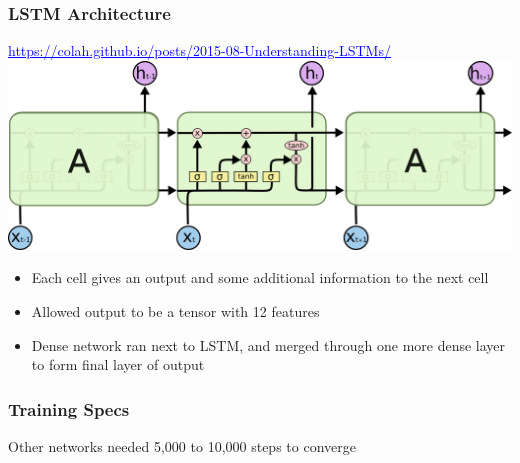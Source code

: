 \documentclass{beamer}
\newcommand{\link}[2]{\href{#2}{\textcolor{blue}{\underline{#1}}}}
\begin{document}
\begin{frame}
  \frametitle{LSTM Architecture}

  \link{https://colah.github.io/posts/2015-08-Understanding-LSTMs/}{https://colah.github.io/posts/2015-08-Understanding-LSTMs/}
  \includegraphics[width=\linewidth]{LSTM3-chain.png}

  \begin{itemize}
  \item Each cell gives an output and some additional information to the next cell
  \item Allowed output to be a tensor with 12 features
  \item Dense network ran next to LSTM,
    and merged through one more dense layer
    to form final layer of output
  \end{itemize}

\end{frame}

\begin{frame}
  \frametitle{Training Specs}

  Other networks needed 5,000 to 10,000 steps to converge

\end{frame}
\end{document}
